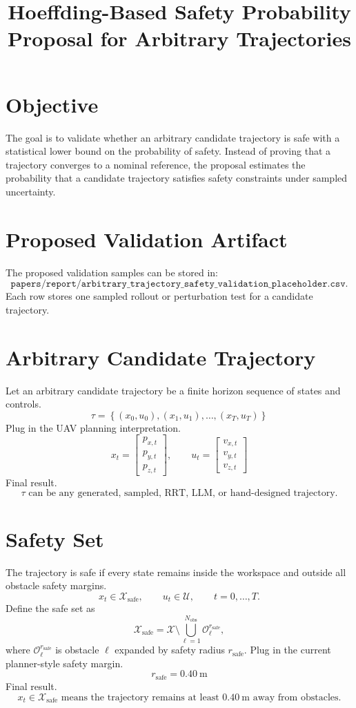 \documentclass[11pt]{article}
\title{\textbf{Hoeffding-Based Safety Probability Proposal for Arbitrary Trajectories}}
\author{}
\date{}
\begin{document}
\maketitle

\section*{Objective}

The goal is to validate whether an arbitrary candidate trajectory is safe with a statistical lower bound on the probability of safety.
Instead of proving that a trajectory converges to a nominal reference, the proposal estimates the probability that a candidate trajectory satisfies safety constraints under sampled uncertainty.

\section*{Proposed Validation Artifact}

The proposed validation samples can be stored in:
\[
\texttt{papers/report/arbitrary\_trajectory\_safety\_validation\_placeholder.csv}.
\]
Each row stores one sampled rollout or perturbation test for a candidate trajectory.

\section*{Arbitrary Candidate Trajectory}

Let an arbitrary candidate trajectory be a finite horizon sequence of states and controls.
\[
\tau=
\left\{
(x_0,u_0),(x_1,u_1),\ldots,(x_T,u_T)
\right\}
\]
Plug in the UAV planning interpretation.
\[
x_t=
\begin{bmatrix}
p_{x,t}\\
p_{y,t}\\
p_{z,t}
\end{bmatrix},
\qquad
u_t=
\begin{bmatrix}
v_{x,t}\\
v_{y,t}\\
v_{z,t}
\end{bmatrix}
\]
Final result.
\[
\boxed{\tau \text{ can be any generated, sampled, RRT, LLM, or hand-designed trajectory.}}
\]

\section*{Safety Set}

The trajectory is safe if every state remains inside the workspace and outside all obstacle safety margins.
\[
x_t\in\mathcal X_{\mathrm{safe}},
\qquad
u_t\in\mathcal U,
\qquad
t=0,\ldots,T.
\]
Define the safe set as
\[
\mathcal X_{\mathrm{safe}}
=
\mathcal X
\setminus
\bigcup_{\ell=1}^{N_{\mathrm{obs}}}
\mathcal O_\ell^{r_{\mathrm{safe}}},
\]
where \(\mathcal O_\ell^{r_{\mathrm{safe}}}\) is obstacle \(\ell\) expanded by safety radius \(r_{\mathrm{safe}}\).
Plug in the current planner-style safety margin.
\[
r_{\mathrm{safe}}=0.40\ \mathrm{m}
\]
Final result.
\[
\boxed{
x_t\in\mathcal X_{\mathrm{safe}}
\text{ means the trajectory remains at least }0.40\ \mathrm{m}
\text{ away from obstacles.}
}
\]
\end{document}
